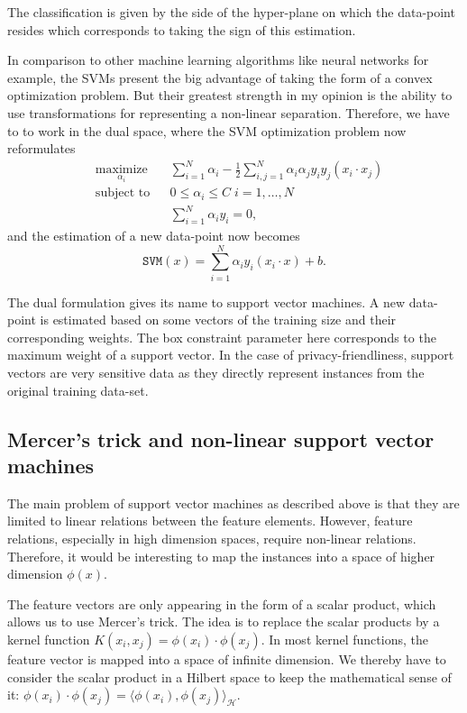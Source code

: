 The classification is given by the side of the hyper-plane on which the data-point resides which corresponds to taking the sign of this estimation.

In comparison to other machine learning algorithms like neural networks for example, the SVMs present the big advantage of taking the form of a convex optimization problem. But their greatest strength in my opinion is the ability to use transformations for representing a non-linear separation. Therefore, we have to to work in the dual space, where the SVM optimization problem now reformulates
\begin{equation}
    \begin{aligned}
& \underset{\alpha_i}{\text{maximize}} 
& & \sum_{i=1}^N \alpha_i - \frac12 \sum_{i,j=1}^N \alpha_i \alpha_j y_i y_j (x_i \cdot x_j) \\
& \text{subject to}
& & 0 \leq \alpha_i \leq C \; i = 1, \ldots, N \\
& 
& & \sum_{i=1}^N\alpha_i y_i = 0,
\end{aligned}
\end{equation}
and the estimation of a new data-point now becomes
\begin{equation}
    \mathtt{SVM}(x) = \sum_{i=1}^N \alpha_i y_i (x_i \cdot x) + b.
\end{equation}

The dual formulation gives its name to support vector machines. A new data-point is estimated based on some vectors of the training size and their corresponding weights. The box constraint parameter here corresponds to the maximum weight of a support vector. In the case of privacy-friendliness, support vectors are very sensitive data as they directly represent instances from the original training data-set.

\subsection{Mercer's trick and non-linear support vector machines}
The main problem of support vector machines as described above is that they are limited to linear relations between the feature elements. However, feature relations, especially in high dimension spaces, require non-linear relations. Therefore, it would be interesting to map the instances into a space of higher dimension $\phi(x)$.

The feature vectors are only appearing in the form of a scalar product, which allows us to use Mercer's trick. The idea is to replace the scalar products by a kernel function $K(x_i,x_j) = \phi(x_i) \cdot \phi(x_j)$. In most kernel functions, the feature vector is mapped into a space of infinite dimension. We thereby have to consider the scalar product in a Hilbert space to keep the mathematical sense of it: $\phi(x_i) \cdot \phi(x_j) = \langle \phi(x_i), \phi(x_j) \rangle_{\mathcal{H}}$.

